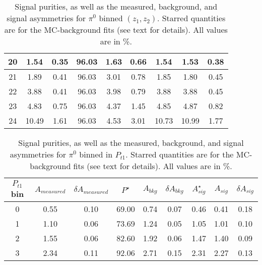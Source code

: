 \begin{table}[H]
\begin{tabular}{|c|c|c|c|c|c|c|c|c|}
\hline
20 & 1.54 & 0.35 & 96.03 & 1.63 & 0.66 & 1.54 & 1.53 & 0.38 \\ \hline 
21 & 1.89 & 0.41 & 96.03 & 3.01 & 0.78 & 1.85 & 1.80 & 0.45 \\ \hline 
22 & 3.88 & 0.41 & 96.03 & 3.98 & 0.79 & 3.88 & 3.88 & 0.45 \\ \hline 
23 & 4.83 & 0.75 & 96.03 & 4.37 & 1.45 & 4.85 & 4.87 & 0.82 \\ \hline 
24 & 10.49 & 1.61 & 96.03 & 4.53 & 3.01 & 10.73 & 10.99 & 1.77 \\ \hline 
\end{tabular}
\caption[BG-correction quantities for $\pi^0$ asymmetries, $(z_1,z_2)$ bins]{Signal purities, as well as the measured, background, and signal asymmetries for $\pi^0$ binned $(z_1,z_2)$. Starred quantities are for the MC-background fits (see text for details). All values are in \%.}
\label{tab:comzbkgcor}
\end{table} 

\begin{table}[H]\footnotesize
\centering
\begin{tabular}{|c|c|c|c|c|c|c|c|c|}
\hline
$P_{t1}$ bin & $A_{measured}$ & $\delta A_{measured}$ & $P^{\star}$& $A_{bkg}$ & $\delta A_{bkg}$ & $A_{sig}^{\star}$ & $ A_{sig}$ & $\delta A_{sig}$ \\ \hline\hline
0 & 0.55 & 0.10 & 69.00 & 0.74 & 0.07 & 0.46 & 0.41 & 0.18 \\ \hline 
1 & 1.10 & 0.06 & 73.69 & 1.24 & 0.05 & 1.05 & 1.01 & 0.10 \\ \hline 
2 & 1.55 & 0.06 & 82.60 & 1.92 & 0.06 & 1.47 & 1.40 & 0.09 \\ \hline 
3 & 2.34 & 0.11 & 92.06 & 2.71 & 0.15 & 2.31 & 2.27 & 0.13 \\ \hline 
\end{tabular}
\caption[BG-correction quantities for $\pi^0$ asymmetries, $P_{t1}$ bins]{Signal purities, as well as the measured, background, and signal asymmetries for $\pi^0$ binned in $P_{t1}$. Starred quantities are for the MC-background fits (see text for details). All values are in \%.}
\label{tab:sinptbkgcor}
\end{table}

